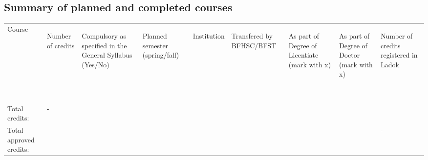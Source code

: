 \subsection{Summary of planned and completed courses}
{\small
\begin{tabular}{p{4.8cm}p{.7cm}p{1.2cm}p{1cm}p{1cm}p{1cm}p{.8cm}p{.8cm}p{.8cm}}
Course & \begin{sideways} \scriptsize{Number of credits} \end{sideways} & \begin{sideways} \begin{minipage}{3cm}\raggedright\scriptsize{Compulsory as specified in the General Syllabus (Yes/No)}\end{minipage} \end{sideways}
& \begin{sideways} \begin{minipage}{3cm}\raggedright\scriptsize{Planned semester (spring/fall)}\end{minipage} \end{sideways}& \begin{sideways} \scriptsize{Institution} \end{sideways}& \begin{sideways} \begin{minipage}{3cm}\raggedright\scriptsize{Transfered by BFHSC/BFST}\end{minipage} \end{sideways}& \begin{sideways}\begin{minipage}{3.5cm}\raggedright \scriptsize{As part of Degree of Licentiate (mark with x)} \end{minipage}\end{sideways}& \begin{sideways} \begin{minipage}{3.5cm}\raggedright\scriptsize{As part of Degree of Doctor (mark with x)} \end{minipage}\end{sideways}& \begin{sideways} \begin{minipage}{3cm}\raggedright\scriptsize{Number of credits registered in Ladok} \end{minipage}\end{sideways}\\
%
%
\rowcolor[gray]{0.90}  &  &  &  &  &  &  &  &  \\
\rowcolor[gray]{0.95}  &  &  &  &  &  &  &  &  \\
\rowcolor[gray]{0.90}  &  &  &  &  &  &  &  &  \\
\rowcolor[gray]{0.95}  &  &  &  &  &  &  &  &  \\
\rowcolor[gray]{0.90}  &  &  &  &  &  &  &  &  \\
\rowcolor[gray]{0.95}  &  &  &  &  &  &  &  &  \\
\hfill Total credits: &\cellcolor[gray]{0.95}   -     & & & & & & & \\
\hfill Total approved credits: & & & & & & & &\cellcolor[gray]{0.95}    -   \\
\end{tabular}}

